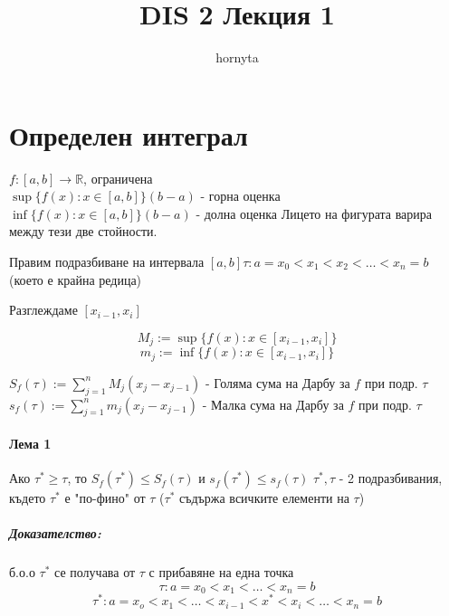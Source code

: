 \documentclass{article}
\author{hornyta}
\title{DIS 2 Лекция 1}
\begin{document}
\maketitle

\section{Определен интеграл}

    \begin{minipage}{0.39\linewidth}
        
    \end{minipage}
    \begin{minipage}{0.6\linewidth}
        \(f:[a,b] \to \mathbb{R} \), ограничена \\
        \(\sup\{ f(x) : x \in [a, b] \} (b-a)\) - горна оценка\\
        \(\inf\{ f(x) : x \in [a, b] \} (b-a)\) - долна оценка
        Лицето на фигурата варира между тези две стойности.
    \end{minipage}
    Правим подразбиване на интервала \([a, b] \tau: a=x_0<x_1<x_2<\dots<x_n=b\) 
    (което е крайна редица)
    
    \begin{minipage}{0.39\linewidth}
        
    \end{minipage}
    \begin{minipage}{0.6\linewidth}
        \begin{center}
            Разглеждаме \([x_{i-1}, x_i]\)
        \end{center}
        \[M_j := \sup\{f(x) : x \in [x_{i-1}, x_i] \}\]
        \[m_j := \inf\{f(x) : x \in [x_{i-1}, x_i] \}\]
    \end{minipage}
    \(S_f(\tau) := \sum_{j=1}^{n} M_j(x_j-x_{j-1})\) - Голяма сума на Дарбу за \(f\) при подр. \(\tau\)
    \(s_f(\tau) := \sum_{j=1}^{n} m_j(x_j-x_{j-1})\) - Малка сума на Дарбу за \(f\) при подр. \(\tau\) 

    \paragraph{Лема 1} Ако \(\tau^* \ge \tau \), то \(S_f(\tau^*) \le S_f(\tau)\) и \(s_f(\tau^*) \le s_f(\tau)\)
    \(\tau^*, \tau\) - 2 подразбивания, където \(\tau^*\) е "по-фино" от \(\tau\) (\(\tau^*\) съдържа всичките елементи на \(\tau\))
    \subparagraph{Доказателство:} б.о.о \(\tau^*\) се получава от \(\tau\) с прибавяне на една точка
    \[\tau: a=x_0<x_1<\dots<x_n=b\]
    \[\tau^*: a=x_o<x_1<\dots<x_{i-1}<x^*<x_i<\dots<x_n=b\]
    
\end{document}
